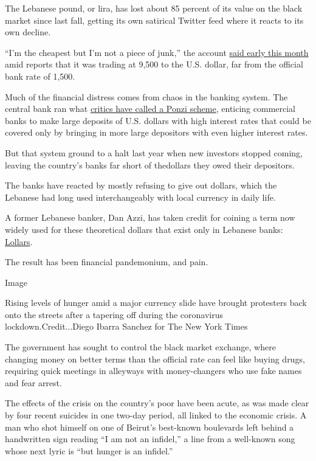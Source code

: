 The Lebanese pound, or lira, has lost about 85 percent of its value on
the black market since last fall, getting its own satirical Twitter feed
where it reacts to its own decline.

``I'm the cheapest but I'm not a piece of junk,'' the account
\href{https://twitter.com/LebaneseLira/status/1278727340768534529}{said
early this month} amid reports that it was trading at 9,500 to the U.S.
dollar, far from the official bank rate of 1,500.

Much of the financial distress comes from chaos in the banking system.
The central bank ran what
\href{https://www.nytimes3xbfgragh.onion/2019/12/02/opinion/lebanon-protests.html}{critics
have called a Ponzi scheme}, enticing commercial banks to make large
deposits of U.S. dollars with high interest rates that could be covered
only by bringing in more large depositors with even higher interest
rates.

But that system ground to a halt last year when new investors stopped
coming, leaving the country's banks far short of thedollars they owed
their depositors.

The banks have reacted by mostly refusing to give out dollars, which the
Lebanese had long used interchangeably with local currency in daily
life.

A former Lebanese banker, Dan Azzi, has taken credit for coining a term
now widely used for these theoretical dollars that exist only in
Lebanese banks: \href{https://www.lollar.club/}{Lollars}.

The result has been financial pandemonium, and pain.

Image

Rising levels of hunger amid a major currency slide have brought
protesters back onto the streets after a tapering off during the
coronavirus lockdown.Credit...Diego Ibarra Sanchez for The New York
Times

The government has sought to control the black market exchange, where
changing money on better terms than the official rate can feel like
buying drugs, requiring quick meetings in alleyways with money-changers
who use fake names and fear arrest.

The effects of the crisis on the country's poor have been acute, as was
made clear by four recent suicides in one two-day period, all linked to
the economic crisis. A man who shot himself on one of Beirut's
best-known boulevards left behind a handwritten sign reading ``I am not
an infidel,'' a line from a well-known song whose next lyric is ``but
hunger is an infidel.''

